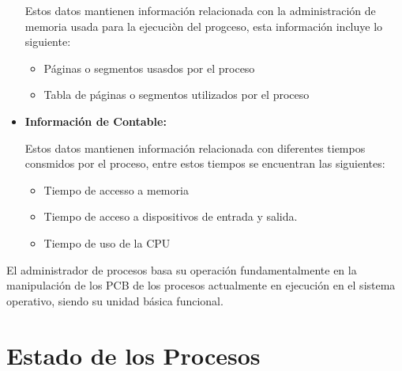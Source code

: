 \documentclass[12pt, fleqn]{report}                             %
\begin{document}
\begin{itemize}
                        Estos datos mantienen información relacionada con la administración de memoria
                        usada para la ejecuciòn del progceso, esta información incluye lo siguiente:

                        \begin{itemize}
                            \item Páginas o segmentos usasdos por el proceso
                            \item Tabla de páginas o segmentos utilizados por el proceso 
                        \end{itemize}
                
                \item
                    \textbf{Información de Contable:}
                    
                        Estos datos mantienen información relacionada con diferentes tiempos consmidos por
                        el proceso, entre estos tiempos se encuentran las siguientes: 
                        \begin{itemize}
                            \item Tiempo de accesso a memoria 
                            \item Tiempo de acceso a dispositivos de entrada y salida.
                            \item Tiempo de uso de la CPU
                        \end{itemize}

                \end{itemize}

                El administrador de procesos basa su operación fundamentalmente en la manipulación de los PCB
                de los procesos actualmente en ejecución en el sistema operativo, siendo su unidad básica funcional.
        


        \section{Estado de los Procesos}
\end{document}
